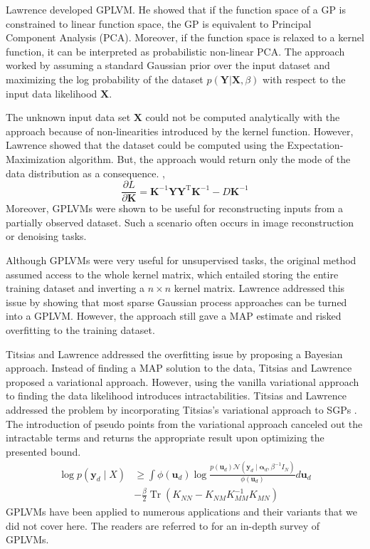 \documentclass[letterpaper,11pt]{extarticle}
\begin{document}
Lawrence \cite{Lawrence04,Lawrence05} developed GPLVM. He showed that if the function space of a GP is constrained to linear function space, the GP is equivalent to Principal Component Analysis (PCA). Moreover, if the function space is relaxed to a kernel function, it can be interpreted as probabilistic non-linear PCA. The approach worked by assuming a standard Gaussian prior over the input dataset and maximizing the log probability of the dataset $p( \mathbf{Y}| \mathbf{X}, \beta)$ with respect to the input data likelihood $\mathbf{X}$. 

The unknown input data set $\mathbf{X}$ could not be computed analytically with the approach because of non-linearities introduced by the kernel function. However, Lawrence \cite{Lawrence04, Lawrence05} showed that the dataset could be computed using the Expectation-Maximization algorithm. But, the approach would return only the mode of the data distribution as a consequence. ,
$$
\frac{\partial L}{\partial \mathbf{K}}=\mathbf{K}^{-1} \mathbf{Y} \mathbf{Y}^{\mathrm{T}} \mathbf{K}^{-1}-D \mathbf{K}^{-1}
$$
Moreover, GPLVMs were shown to be useful for reconstructing inputs from a partially observed dataset. Such a scenario often occurs in image reconstruction or denoising tasks.

Although GPLVMs were very useful for unsupervised tasks, the original method assumed access to the whole kernel matrix, which entailed storing the entire training dataset and inverting a $n \times n$ kernel matrix. Lawrence \cite{Lawrence07} addressed this issue by showing that most sparse Gaussian process approaches can be turned into a GPLVM. However, the approach still gave a MAP estimate and risked overfitting to the training dataset. 

Titsias and Lawrence \cite{TitsiasL10} addressed the overfitting issue by proposing a Bayesian approach. Instead of finding a MAP solution to the data, Titsias and Lawrence proposed a variational approach. However, using the vanilla variational approach to finding the data likelihood introduces intractabilities. Titsias and Lawrence addressed the problem by incorporating Titsias's variational approach to SGPs \cite{Titsias09}. The introduction of pseudo points from the variational approach \cite{Titsias09} canceled out the intractable terms and returns the appropriate result upon optimizing the presented bound. 
$$
\begin{aligned}
\log p\left(\mathbf{y}_{d} \mid X\right) & \geq \int \phi\left(\mathbf{u}_{d}\right) \log \frac{p\left(\mathbf{u}_{d}\right) \mathcal{N}\left(\mathbf{y}_{d} \mid \boldsymbol{\alpha}_{d}, \beta^{-1} I_{N}\right)}{\phi\left(\mathbf{u}_{d}\right)} d \mathbf{u}_{d} \\
&-\frac{\beta}{2} \operatorname{Tr}\left(K_{N N}-K_{N M} K_{M M}^{-1} K_{M N}\right)
\end{aligned}
$$
GPLVMs have been applied to numerous applications and their variants that we did not cover here. The readers are referred to \cite{LiC16} for an in-depth survey of GPLVMs. 
\end{document}
